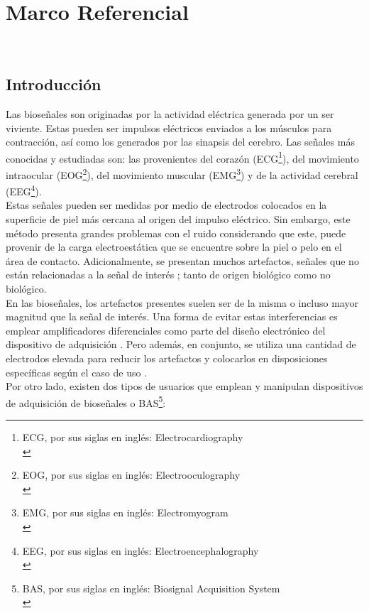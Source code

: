 \chapter{Marco Referencial}\\

\section{Introducción}
\label{sec:org220dcc6}
Las bioseñales son originadas por la actividad eléctrica generada por un ser viviente. Estas pueden ser impulsos eléctricos enviados a los músculos para contracción, así como los generados por las sinapsis del cerebro. Las señales más conocidas y estudiadas son: las provenientes del corazón (ECG\footnote{ECG, por sus siglas en inglés: Electrocardiography\\}), del movimiento intraocular (EOG\footnote{EOG, por sus siglas en inglés: Electrooculography\\}), del movimiento muscular (EMG\footnote{EMG, por sus siglas en inglés: Electromyogram\\}) y de la actividad cerebral (EEG\footnote{EEG, por sus siglas en inglés: Electroencephalography\\}).\\

Estas señales pueden ser medidas por medio de electrodos colocados en la superficie de piel más cercana al origen del impulso eléctrico. Sin embargo, este método presenta grandes problemas con el ruido considerando que este, puede provenir de la carga electroestática que se encuentre sobre la piel o pelo en el área de contacto. Adicionalmente, se presentan muchos artefactos, señales que no están relacionadas a la señal de interés \cite{I.R.KeckV.FischerC.G.Puntonet2011}; tanto de origen biológico como no biológico.\\

En las bioseñales, los artefactos presentes suelen ser de la misma o incluso mayor magnitud que la señal de interés. Una forma de evitar estas interferencias es emplear amplificadores diferenciales como parte del diseño electrónico del dispositivo de adquisición \cite{Winter1983}. Pero además, en conjunto, se utiliza una cantidad de electrodos elevada para reducir los artefactos y colocarlos en disposiciones específicas según el caso de uso \cite{Jurcak2007}.\\

Por otro lado, existen dos tipos de usuarios que emplean y manipulan dispositivos de adquisición de bioseñales o BAS\footnote{BAS, por sus siglas en inglés: Biosignal Acquisition System\\}:\\

